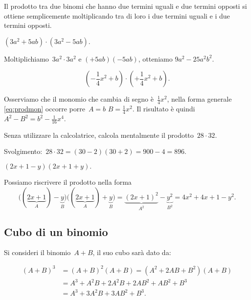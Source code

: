 \osservazione Il prodotto tra due binomi che hanno due termini
uguali e due termini opposti si ottiene semplicemente moltiplicando tra
di loro i due termini uguali e i due termini opposti.

\begin{exrig}
 \begin{esempio}
$\left(3a^{2}+5{ab}\right)\cdot \left(3a^{2}-5{ab}\right).$

Moltiplichiamo~$3a^{2}\cdot 3a^{2}$ e
$\left(+5{ab}\right)\left(-5{ab}\right)$, otteniamo
$9a^{2}-25a^{2}b^{2}$.
 \end{esempio}

 \begin{esempio}
 \[\left(-{\frac{1}{4}}x^{2}+b\right)\cdot \left(+{\frac{1}{4}}x^{2}+b\right).\]

Osserviamo che il monomio che cambia di segno è~$\frac{1}{4}x^{2}$,
nella forma generale \eqref{eq:prodmon} occorre porre~$A=b$ $B=\frac{1}{4}x^{2}$.
Il risultato è quindi~$A^{2}-B^{2}=b^{2}-\frac{1}{16}x^{4}$.
 \end{esempio}

 \begin{esempio}
 Senza utilizzare la calcolatrice, calcola mentalmente il prodotto~$28\cdot 32$.

Svolgimento:~$28\cdot 32=(30-2)(30+2)=900-4=896$.
 \end{esempio}

 \begin{esempio}
$(2x+1-y)(2x+1+y).$

Possiamo riscrivere il prodotto nella forma
\[\big((\underbrace{2x+1}_{A})-\underbrace{y}_{B}\big)\big((\underbrace{2x+1}_{A})+\underbrace{y}_{B}\big)=\underbrace{(2x+1)^{2}}_{A^{2}}-\underbrace{y^{2}}_{B^{2}}=4x^{2}+4x+1-y^{2}.\]
 \end{esempio}

\end{exrig}


\subsection{Cubo di un binomio}
\label{subsec:11_prodnot_cubo}

Si consideri il binomio~$A+B$, il suo cubo sarà dato da:

\begin{align*}
\left(A+B\right)^{3}&=\left(A+B\right)^{2}\left(A+B\right)=\left(A^{2}+2{AB}+B^{2}\right)\left(A+B\right)\\
&=A^{3}+A^{2}B+2A^{2}B+2{AB}^{2}+{AB}^{2}+B^{3}\\
&=A^{3}+3A^{2}B+3{AB}^{2}+B^{3}.
\end{align*}

